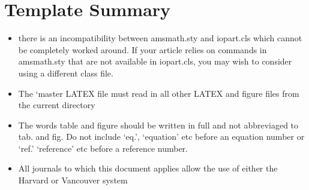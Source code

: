 \section{Template Summary}

\begin{itemize}
  \item there is an incompatibility between amsmath.sty and iopart.cls
  which cannot be completely worked around. If your article relies on commands in
  amsmath.sty that are not available in iopart.cls, you may wish to consider using a
  diﬀerent class ﬁle.
  \item The ‘master LATEX ﬁle
  must read in all other LATEX and ﬁgure ﬁles from the current directory
  \item The words table and ﬁgure should be written in full and not abbreviaged to tab.
  and ﬁg. Do not include ‘eq.’, ‘equation’ etc before an equation number or ‘ref.’
  ‘reference’ etc before a reference number.
  \item All journals to which this document applies allow
  the use of either the Harvard or Vancouver system
\end{itemize}